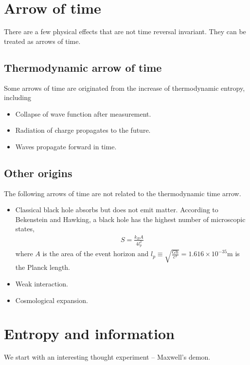 \documentclass[12pt]{book} %
\numberwithin{equation}{chapter}
\begin{document}
\section{Arrow of time}
There are a few physical effects that are not time reversal invariant. They can be treated as arrows of time.

\subsection*{Thermodynamic arrow of time}
Some arrows of time are originated from the increase of thermodynamic entropy, including
\begin{itembox}
\begin{itemize}
\item Collapse of wave function after measurement. 
\item Radiation of charge propagates to the future.
\item Waves propagate forward in time.
\end{itemize}
\end{itembox}

\subsection*{Other origins}
The following arrows of time are not related to the thermodynamic time arrow.
\begin{itembox}
\begin{itemize}
\item Classical black hole absorbs but does not emit matter. According to Bekenstein and Hawking, a black hole has the highest number of microscopic states,
\begin{align*}
S=\frac{k_{B}A}{4l_{p}^{2}}
\end{align*}
where $A$ is the area of the event horizon and $l_{p}\equiv\sqrt{\frac{G\hbar}{c^{3}}}=1.616\times10^{-35}\text{m}$ is the Planck length.
\item Weak interaction.
\item Cosmological expansion.
\end{itemize}
\end{itembox}

\section{Entropy and information}
We start with an interesting thought experiment -- Maxwell's demon.
\end{document}
